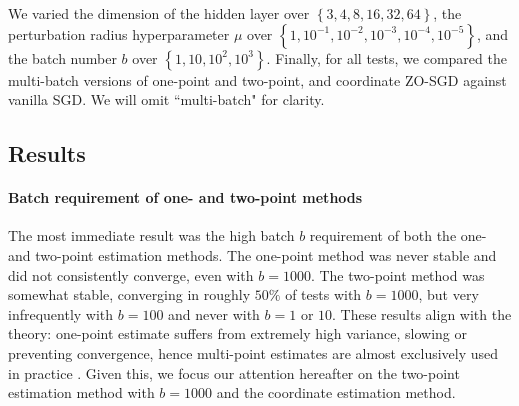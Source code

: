 We varied the dimension of the hidden layer over $\left\{3, 4, 8, 16, 32, 64\right\}$, the perturbation radius hyperparameter $\mu$ over $\left\{1, 10^{-1},10^{-2},10^{-3},10^{-4},10^{-5}\right\}$, and the batch number $b$ over $\left\{1, 10, 10^2, 10^3\right\}$. Finally, for all tests, we compared the multi-batch versions of one-point and two-point, and coordinate ZO-SGD against vanilla SGD. We will omit ``multi-batch" for clarity.


\subsection{Results}

\paragraph{Batch requirement of one- and two-point methods}
The most immediate result was the high batch $b$ requirement of both the one- and two-point estimation methods. The one-point method was never stable and did not consistently converge, even with $b = 1000$. The two-point method was somewhat stable, converging in roughly $50\%$ of tests with $b = 1000$, but very infrequently with $b = 100$ and never with $b = 1$ or $10$. These results align with the theory: one-point estimate suffers from extremely high variance, slowing or preventing convergence, hence multi-point estimates are almost exclusively used in practice \cite{flaxman2004online}. Given this, we focus our attention hereafter on the two-point estimation method with $b = 1000$ and the coordinate estimation method.

